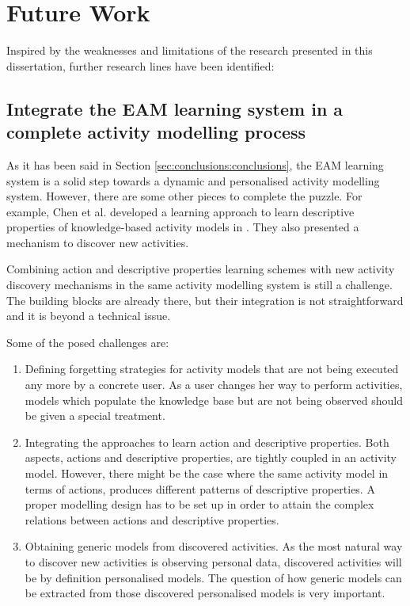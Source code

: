 \section{Future Work}
\label{sec:conclusions:future}

Inspired by the weaknesses and limitations of the research presented in this dissertation, further research lines have been identified:

\subsection{Integrate the EAM learning system in a complete activity modelling process}

As it has been said in Section \ref{sec:conclusions:conclusions}, the EAM learning system is a solid step towards a dynamic and personalised activity modelling system. However, there are some other pieces to complete the puzzle. For example, Chen et al. developed a learning approach to learn descriptive properties of knowledge-based activity models in \cite{Chen2014}. They also presented a mechanism to discover new activities.

Combining action and descriptive properties learning schemes with new activity discovery mechanisms in the same activity modelling system is still a challenge. The building blocks are already there, but their integration is not straightforward and it is beyond a technical issue. 

Some of the posed challenges are:

\begin{enumerate}
 \item Defining forgetting strategies for activity models that are not being executed any more by a concrete user. As a user changes her way to perform activities, models which populate the knowledge base but are not being observed should be given a special treatment.
 \item Integrating the approaches to learn action and descriptive properties. Both aspects, actions and descriptive properties, are tightly coupled in an activity model. However, there might be the case where the same activity model in terms of actions, produces different patterns of descriptive properties. A proper modelling design has to be set up in order to attain the complex relations between actions and descriptive properties.
 \item Obtaining generic models from discovered activities. As the most natural way to discover new activities is observing personal data, discovered activities will be by definition personalised models. The question of how generic models can be extracted from those discovered personalised models is very important.
\end{enumerate}


